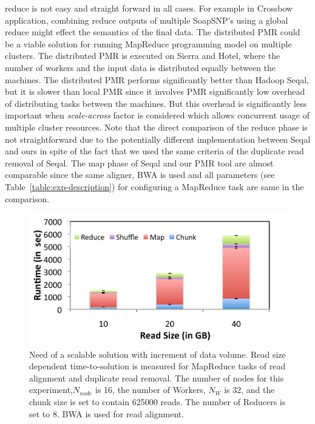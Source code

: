 \documentclass{acm_proc_article-sp}
\begin{document}
reduce is not easy and straight forward in all cases. For example in Crossbow application, combining reduce outputs of multiple SoapSNP's using a global reduce might effect the semantics of the final data. The distributed PMR could be a viable solution for running MapReduce programming model on multiple clusters. The distributed PMR is executed on Sierra and Hotel, where the number of workers and the input data is distributed equally between the machines. The distributed PMR performs significantly better than Hadoop Seqal, but it is slower than local PMR since it involves PMR significantly low overhead of distributing tasks between the machines.  But this overhead is significantly less important when \textit{scale-across} factor is considered which allows concurrent usage of multiple cluster resources. Note that the direct comparison of the reduce phase is not straightforward due to the potentially different implementation between Seqal and ours in spite of the fact that we used the same criteria of the duplicate read removal of Seqal\cite{seal_2011_mapred}. The map phase of Seqal and our PMR tool are almost comparable since the same aligner, BWA is used and all parameters (see Table~\ref{table:exp-description}) for configuring a MapReduce task are same in the comparison.   



 \begin{figure}
 \centering
\includegraphics[scale=0.50]{figures/pj-smr-tts.pdf} 
\caption{\small Need of a scalable solution with increment of data volume.  Read size dependent time-to-solution is measured for MapReduce tasks of read alignment and duplicate read removal.  The number of nodes for this experiment,$N_{node}$ is 16, the number of Workers, $N_W$ is 32, and the chunk size is set to contain 625000 reads.  The number of Reducers is set to 8. BWA is used for read alignment.}
  \label{fig:read-size} 
\end{figure}
\end{document}
